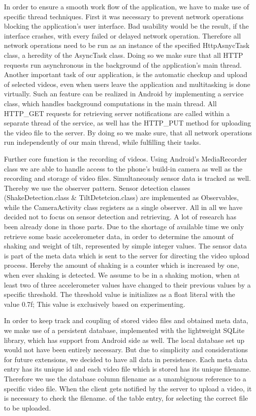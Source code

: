 \documentclass[conference]{IEEEtran}
\begin{document}
In order to ensure a smooth work flow of the application, we have to make use of specific thread techniques.
First it was necessary to prevent network operations blocking the application's user interface. Bad usability would be the result, if the interface crashes, with every failed or delayed network operation. Therefore all network operations need to be run as an instance of the specified HttpAsnycTask class, a heredity of the AsyncTask class. Doing so we make sure that all HTTP requests run asynchronous in the background of the application's main thread.
Another important task of our application, is the automatic checkup and upload of selected videos, even when users leave the application and multitasking is done virtually. Such an feature can be realized in Android by implementing a service class, which handles background computations in the main thread. All HTTP\_GET requests for retrieving server notifications are called within a separate thread of the service, as well has the HTTP\_PUT method for uploading the video file to the server. By doing so we make sure, that all network operations run independently of our main thread, while fulfilling their tasks.

Further core function is the recording of videos. Using Android's MediaRecorder class we are able to handle access to the phone's build-in camera as well as the recording and storage of video files.
Simultaneously sensor data is tracked as well. Thereby we use the observer pattern. Sensor detection classes (ShakeDetection.class \& TiltDetetcion.class) are implemented as Observables, while the CameraActivity class registers as a single observer. All in all we have decided not to focus on sensor detection and retrieving. A lot of research has been already done in those parts. Due to the shortage of available time we only retrieve some basic accelerometer data, in order to determine the amount of shaking and weight of tilt, represented by simple integer values. The sensor data is part of the meta data which is sent to the server for directing the video upload process. Hereby the amount of shaking is a counter which is increased by one, when ever shaking is detected. We assume to be in a shaking motion, when at least two of three accelerometer values have changed to their previous values by a specific threshold. The threshold value is initializes as a float literal with the value 0.7f; This value is exclusively based on experimenting.

In order to keep track and coupling of stored video files and obtained meta data, we make use of a persistent database, implemented with the lightweight SQLite library, which has support from Android side as well. The local database set up would not have been entirely necessary. But due to simplicity and considerations for future extensions, we decided to have all data in persistence.
Each meta data entry has its unique id and each video file which is stored has its unique filename. Therefore we use the database column filename as a unambiguous reference to a specific video file. When the client gets notified by the server to upload a video, it is necessary to check the filename. of the table entry, for selecting the correct file to be uploaded.
\end{document}
